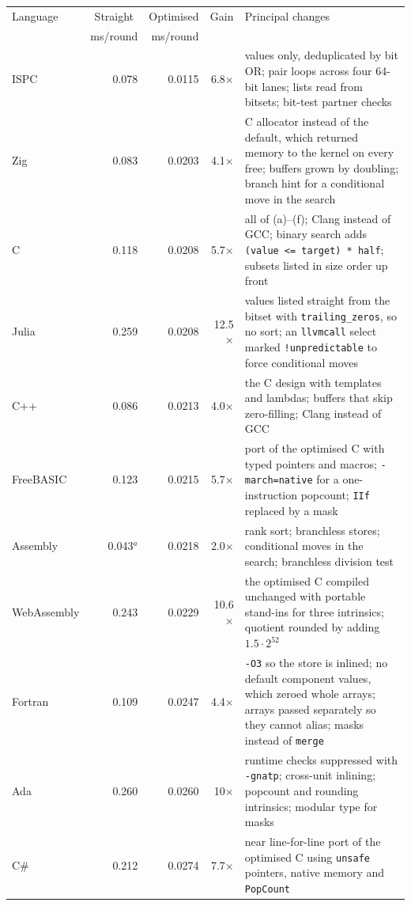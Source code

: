 \documentclass[11pt,a4paper]{article}
\theoremstyle{definition}
\theoremstyle{remark}
\begin{document}
\begin{table}[p]
\centering
\scriptsize
\setlength{\tabcolsep}{4pt}
\begin{tabular}{@{}lrrrp{9.5cm}@{}}
\toprule
Language & \multicolumn{1}{c}{Straight} & \multicolumn{1}{c}{Optimised} & \multicolumn{1}{c}{Gain} & Principal changes \\
 & ms/round & ms/round & & \\ \midrule
ISPC & 0.078 & 0.0115 & 6.8$\times$ & values only, deduplicated by bit OR; pair loops across four 64-bit lanes; lists read from bitsets; bit-test partner checks \\
Zig & 0.083 & 0.0203 & 4.1$\times$ & C allocator instead of the default, which returned memory to the kernel on every free; buffers grown by doubling; branch hint for a conditional move in the search \\
C & 0.118 & 0.0208 & 5.7$\times$ & all of (a)--(f); Clang instead of GCC; binary search adds \texttt{(value <= target) * half}; subsets listed in size order up front \\
Julia & 0.259 & 0.0208 & 12.5$\times$ & values listed straight from the bitset with \texttt{trailing\_zeros}, so no sort; an \texttt{llvmcall} select marked \texttt{!unpredictable} to force conditional moves \\
C++ & 0.086 & 0.0213 & 4.0$\times$ & the C design with templates and lambdas; buffers that skip zero-filling; Clang instead of GCC \\
FreeBASIC & 0.123 & 0.0215 & 5.7$\times$ & port of the optimised C with typed pointers and macros; \texttt{-march=native} for a one-instruction popcount; \texttt{IIf} replaced by a mask \\
Assembly & 0.043$^a$ & 0.0218 & 2.0$\times$ & rank sort; branchless stores; conditional moves in the search; branchless division test \\
WebAssembly & 0.243 & 0.0229 & 10.6$\times$ & the optimised C compiled unchanged with portable stand-ins for three intrinsics; quotient rounded by adding $1.5 \cdot 2^{52}$ \\
Fortran & 0.109 & 0.0247 & 4.4$\times$ & \texttt{-O3} so the store is inlined; no default component values, which zeroed whole arrays; arrays passed separately so they cannot alias; masks instead of \texttt{merge} \\
Ada & 0.260 & 0.0260 & 10$\times$ & runtime checks suppressed with \texttt{-gnatp}; cross-unit inlining; popcount and rounding intrinsics; modular type for masks \\
C\# & 0.212 & 0.0274 & 7.7$\times$ & near line-for-line port of the optimised C using \texttt{unsafe} pointers, native memory and \texttt{PopCount} \\

\end{tabular}
\end{table}
\end{document}
